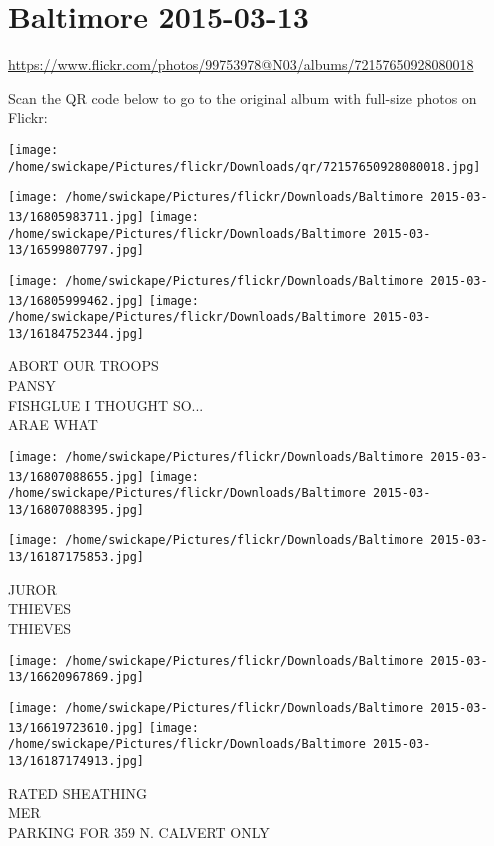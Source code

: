 \documentclass[10pt,letterpaper]{article}
\title{}
\author{}
\date{}
\begin{document}
\section*{Baltimore 2015-03-13}

\url{https://www.flickr.com/photos/99753978@N03/albums/72157650928080018}

Scan the QR code below to go to the original album with full-size photos on Flickr:

\texttt{[image: /home/swickape/Pictures/flickr/Downloads/qr/72157650928080018.jpg]}
\pagebreak

\texttt{[image: /home/swickape/Pictures/flickr/Downloads/Baltimore 2015-03-13/16805983711.jpg]}
\texttt{[image: /home/swickape/Pictures/flickr/Downloads/Baltimore 2015-03-13/16599807797.jpg]}

\texttt{[image: /home/swickape/Pictures/flickr/Downloads/Baltimore 2015-03-13/16805999462.jpg]}
\texttt{[image: /home/swickape/Pictures/flickr/Downloads/Baltimore 2015-03-13/16184752344.jpg]}

ABORT OUR TROOPS\\
PANSY\\
FISHGLUE I THOUGHT SO...\\
ARAE WHAT
\pagebreak

\texttt{[image: /home/swickape/Pictures/flickr/Downloads/Baltimore 2015-03-13/16807088655.jpg]}
\texttt{[image: /home/swickape/Pictures/flickr/Downloads/Baltimore 2015-03-13/16807088395.jpg]}

\texttt{[image: /home/swickape/Pictures/flickr/Downloads/Baltimore 2015-03-13/16187175853.jpg]}

JUROR\\
THIEVES\\
THIEVES
\pagebreak

\texttt{[image: /home/swickape/Pictures/flickr/Downloads/Baltimore 2015-03-13/16620967869.jpg]}

\vspace{0.25in}
\texttt{[image: /home/swickape/Pictures/flickr/Downloads/Baltimore 2015-03-13/16619723610.jpg]}
\texttt{[image: /home/swickape/Pictures/flickr/Downloads/Baltimore 2015-03-13/16187174913.jpg]}

RATED SHEATHING\\
MER\\
PARKING FOR 359 N. CALVERT ONLY
\pagebreak
\end{document}
